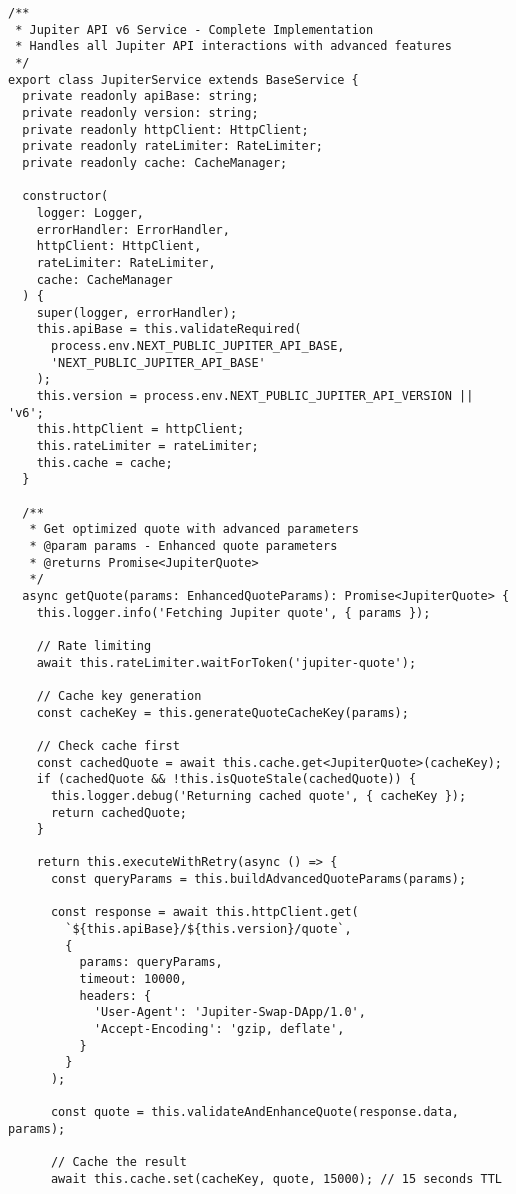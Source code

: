 \documentclass[11pt,a4paper]{article}
\begin{document}
\begin{lstlisting}[style=typescript, caption=Advanced Jupiter API v6 Service]
/**
 * Jupiter API v6 Service - Complete Implementation
 * Handles all Jupiter API interactions with advanced features
 */
export class JupiterService extends BaseService {
  private readonly apiBase: string;
  private readonly version: string;
  private readonly httpClient: HttpClient;
  private readonly rateLimiter: RateLimiter;
  private readonly cache: CacheManager;

  constructor(
    logger: Logger,
    errorHandler: ErrorHandler,
    httpClient: HttpClient,
    rateLimiter: RateLimiter,
    cache: CacheManager
  ) {
    super(logger, errorHandler);
    this.apiBase = this.validateRequired(
      process.env.NEXT_PUBLIC_JUPITER_API_BASE,
      'NEXT_PUBLIC_JUPITER_API_BASE'
    );
    this.version = process.env.NEXT_PUBLIC_JUPITER_API_VERSION || 'v6';
    this.httpClient = httpClient;
    this.rateLimiter = rateLimiter;
    this.cache = cache;
  }

  /**
   * Get optimized quote with advanced parameters
   * @param params - Enhanced quote parameters
   * @returns Promise<JupiterQuote>
   */
  async getQuote(params: EnhancedQuoteParams): Promise<JupiterQuote> {
    this.logger.info('Fetching Jupiter quote', { params });

    // Rate limiting
    await this.rateLimiter.waitForToken('jupiter-quote');

    // Cache key generation
    const cacheKey = this.generateQuoteCacheKey(params);
    
    // Check cache first
    const cachedQuote = await this.cache.get<JupiterQuote>(cacheKey);
    if (cachedQuote && !this.isQuoteStale(cachedQuote)) {
      this.logger.debug('Returning cached quote', { cacheKey });
      return cachedQuote;
    }

    return this.executeWithRetry(async () => {
      const queryParams = this.buildAdvancedQuoteParams(params);
      
      const response = await this.httpClient.get(
        `${this.apiBase}/${this.version}/quote`,
        { 
          params: queryParams,
          timeout: 10000,
          headers: {
            'User-Agent': 'Jupiter-Swap-DApp/1.0',
            'Accept-Encoding': 'gzip, deflate',
          }
        }
      );

      const quote = this.validateAndEnhanceQuote(response.data, params);
      
      // Cache the result
      await this.cache.set(cacheKey, quote, 15000); // 15 seconds TTL
      

\end{lstlisting}
\end{document}
